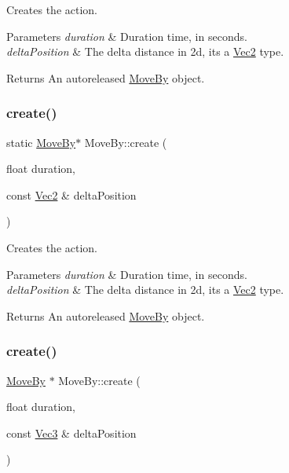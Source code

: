 Creates the action.


\begin{DoxyParams}{Parameters}
{\em duration} & Duration time, in seconds. \\
\hline
{\em delta\+Position} & The delta distance in 2d, it\textquotesingle{}s a \hyperlink{classVec2}{Vec2} type. \\
\hline
\end{DoxyParams}
\begin{DoxyReturn}{Returns}
An autoreleased \hyperlink{classMoveBy}{Move\+By} object. 
\end{DoxyReturn}
\mbox{\label{classMoveBy_a01180b2a61d81859ee785c7232ffbeb9}} 
\subsubsection{\texorpdfstring{create()}{create()}\hspace{0.1cm}{\footnotesize\ttfamily [2/4]}}
{\footnotesize\ttfamily static \hyperlink{classMoveBy}{Move\+By}$\ast$ Move\+By\+::create (\begin{DoxyParamCaption}\item[{float}]{duration,  }\item[{const \hyperlink{classVec2}{Vec2} \&}]{delta\+Position }\end{DoxyParamCaption})\hspace{0.3cm}{\ttfamily [static]}}

Creates the action.


\begin{DoxyParams}{Parameters}
{\em duration} & Duration time, in seconds. \\
\hline
{\em delta\+Position} & The delta distance in 2d, it\textquotesingle{}s a \hyperlink{classVec2}{Vec2} type. \\
\hline
\end{DoxyParams}
\begin{DoxyReturn}{Returns}
An autoreleased \hyperlink{classMoveBy}{Move\+By} object. 
\end{DoxyReturn}
\mbox{\label{classMoveBy_a01ca68a3098b965f7edbf76da1009f3e}} 
\subsubsection{\texorpdfstring{create()}{create()}\hspace{0.1cm}{\footnotesize\ttfamily [3/4]}}
{\footnotesize\ttfamily \hyperlink{classMoveBy}{Move\+By} $\ast$ Move\+By\+::create (\begin{DoxyParamCaption}\item[{float}]{duration,  }\item[{const \hyperlink{classVec3}{Vec3} \&}]{delta\+Position }\end{DoxyParamCaption})\hspace{0.3cm}{\ttfamily [static]}}


